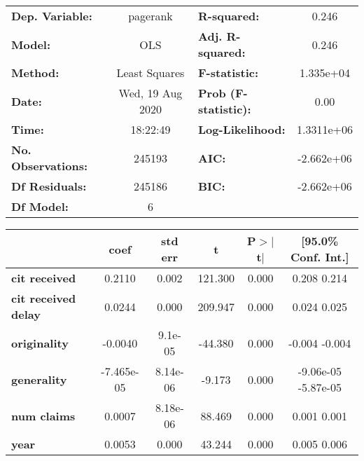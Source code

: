 \begin{center}
\begin{tabular}{lclc}
\toprule
\textbf{Dep. Variable:}     &     pagerank     & \textbf{  R-squared:         } &       0.246    \\
\textbf{Model:}             &       OLS        & \textbf{  Adj. R-squared:    } &       0.246    \\
\textbf{Method:}            &  Least Squares   & \textbf{  F-statistic:       } &   1.335e+04    \\
\textbf{Date:}              & Wed, 19 Aug 2020 & \textbf{  Prob (F-statistic):} &       0.00     \\
\textbf{Time:}              &     18:22:49     & \textbf{  Log-Likelihood:    } &   1.3311e+06   \\
\textbf{No. Observations:}  &      245193      & \textbf{  AIC:               } &   -2.662e+06   \\
\textbf{Df Residuals:}      &      245186      & \textbf{  BIC:               } &   -2.662e+06   \\
\textbf{Df Model:}          &           6      & \textbf{                     } &                \\
\bottomrule
\end{tabular}
\begin{tabular}{lccccc}
                            & \textbf{coef} & \textbf{std err} & \textbf{t} & \textbf{P$>$$|$t$|$} & \textbf{[95.0\% Conf. Int.]}  \\
\midrule
\textbf{cit received}       &       0.2110  &        0.002     &   121.300  &         0.000        &         0.208     0.214       \\
\textbf{cit received delay} &       0.0244  &        0.000     &   209.947  &         0.000        &         0.024     0.025       \\
\textbf{originality}        &      -0.0040  &      9.1e-05     &   -44.380  &         0.000        &        -0.004    -0.004       \\
\textbf{generality}         &   -7.465e-05  &     8.14e-06     &    -9.173  &         0.000        &     -9.06e-05 -5.87e-05       \\
\textbf{num claims}         &       0.0007  &     8.18e-06     &    88.469  &         0.000        &         0.001     0.001       \\
\textbf{year}               &       0.0053  &        0.000     &    43.244  &         0.000        &         0.005     0.006       \\

\end{tabular}
\end{center}
